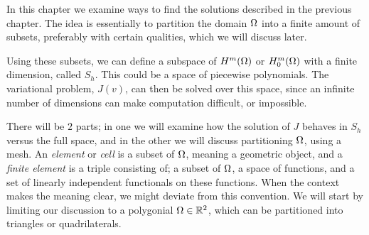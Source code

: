 In this chapter we examine ways to find the solutions described in the previous chapter.
The idea is essentially to partition the domain $\Omega$ into a finite amount 
of subsets, preferably with certain qualities, which we will discuss later. 

Using these subsets, we can define a subspace of $H^m(\Omega)$ or $H^m_0(\Omega)$ 
with a finite dimension, called $S_h$. 
This could be a space of piecewise polynomials. 
The variational problem, $J(v)$, can then be 
solved over this space, since an infinite number of dimensions can make 
computation difficult, or impossible.

There will be $2$ parts; in one we 
will examine how the solution of $J$ behaves in $S_h$ versus the full space, 
and in the other we will discuss partitioning $\Omega$, using a mesh.
An \emph{element} or \emph{cell} is a 
subset of $\Omega$, meaning a geometric object, 
and a \emph{finite element} is a 
triple consisting of; a subset of $\Omega$, a space of functions, and a set of 
linearly independent functionals on these functions.
When the context makes the meaning clear, we might deviate from 
this convention.
We will start by limiting our discussion to a polygonial $\Omega \in \mathbb{R}^2$, which 
can be partitioned into triangles or quadrilaterals.